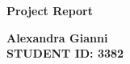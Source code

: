 \documentclass[a4paper,12pt]{article} %
\newcommand{\Title}{Project Report}
\newcommand{\Author}{Alexandra Gianni}
\begin{document}
		\vspace*{0.3cm} %
		
		\begin{center} %
			{\Large \bf \Title} %
			\vspace{2mm}
			
			{\bf\Author \\ STUDENT ID: 3382} %
			
		\end{center}  
		
		\vspace{0.4cm}
		
		
		
	
\end{document}
